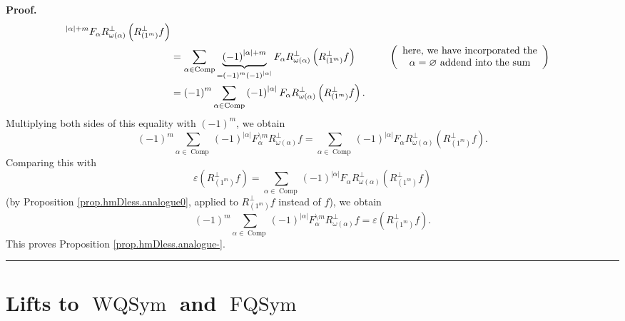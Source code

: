 \documentclass[numbers=enddot,12pt,final,onecolumn,notitlepage,abstracton]{scrartcl}%
\theoremstyle{definition}
\newenvironment{proof}[1][Proof]{\noindent\textbf{#1.} }{\ \rule{0.5em}{0.5em}}
\newenvironment{verlong}{}{}
\let\sumnonlimits\sum
\renewcommand{\sum}{\sumnonlimits\limits}
\begin{document}
\begin{verlong}
\begin{proof}
\begin{align*}
^{\left\vert \alpha\right\vert +m}F_{\alpha}R_{\omega\left(  \alpha\right)
}^{\perp}\left(  R_{\left(  1^{m}\right)  }^{\perp}f\right) \\
&  =\sum_{\alpha\in\operatorname*{Comp}}\underbrace{\left(  -1\right)
^{\left\vert \alpha\right\vert +m}}_{=\left(  -1\right)  ^{m}\left(
-1\right)  ^{\left\vert \alpha\right\vert }}F_{\alpha}R_{\omega\left(
\alpha\right)  }^{\perp}\left(  R_{\left(  1^{m}\right)  }^{\perp}f\right)
\ \ \ \ \ \ \ \ \ \ \left(
\begin{array}
[c]{c}%
\text{here, we have incorporated the}\\
\alpha=\varnothing\text{ addend into the sum}%
\end{array}
\right) \\
&  =\left(  -1\right)  ^{m}\sum_{\alpha\in\operatorname*{Comp}}\left(
-1\right)  ^{\left\vert \alpha\right\vert }F_{\alpha}R_{\omega\left(
\alpha\right)  }^{\perp}\left(  R_{\left(  1^{m}\right)  }^{\perp}f\right)  .
\end{align*}
Multiplying both sides of this equality with $\left(  -1\right)  ^{m}$, we
obtain%
\[
\left(  -1\right)  ^{m}\sum_{\alpha\in\operatorname*{Comp}}\left(  -1\right)
^{\left\vert \alpha\right\vert }F_{\alpha}^{\setminus m}R_{\omega\left(
\alpha\right)  }^{\perp}f=\sum_{\alpha\in\operatorname*{Comp}}\left(
-1\right)  ^{\left\vert \alpha\right\vert }F_{\alpha}R_{\omega\left(
\alpha\right)  }^{\perp}\left(  R_{\left(  1^{m}\right)  }^{\perp}f\right)  .
\]
Comparing this with%
\[
\varepsilon\left(  R_{\left(  1^{m}\right)  }^{\perp}f\right)  =\sum
_{\alpha\in\operatorname*{Comp}}\left(  -1\right)  ^{\left\vert \alpha
\right\vert }F_{\alpha}R_{\omega\left(  \alpha\right)  }^{\perp}\left(
R_{\left(  1^{m}\right)  }^{\perp}f\right)
\]
(by Proposition \ref{prop.hmDless.analogue0}, applied to $R_{\left(
1^{m}\right)  }^{\perp}f$ instead of $f$), we obtain%
\[
\left(  -1\right)  ^{m}\sum_{\alpha\in\operatorname*{Comp}}\left(  -1\right)
^{\left\vert \alpha\right\vert }F_{\alpha}^{\setminus m}R_{\omega\left(
\alpha\right)  }^{\perp}f=\varepsilon\left(  R_{\left(  1^{m}\right)  }%
^{\perp}f\right)  .
\]
This proves Proposition \ref{prop.hmDless.analogue-}.
\end{proof}
\end{verlong}


\section{\label{sect.WQSym}Lifts to $\operatorname*{WQSym}$ and
$\operatorname*{FQSym}$}
\end{document}
